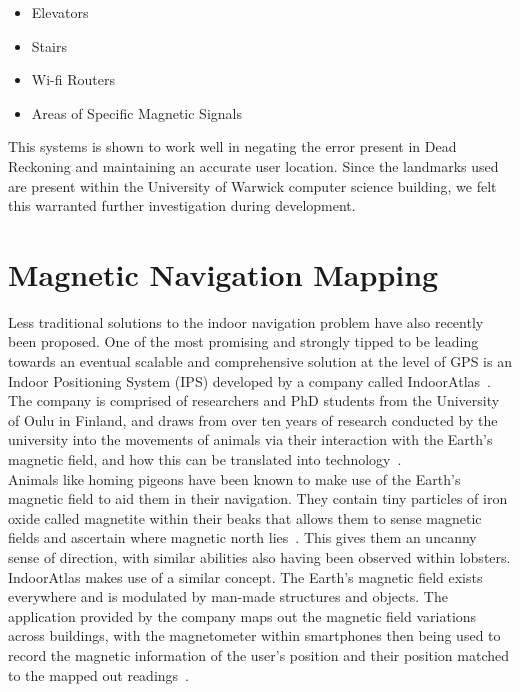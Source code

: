 \documentclass[main.tex]{subfiles}
\begin{document}
\begin{itemize}
	\item Elevators
	\item Stairs
	\item Wi-fi Routers
	\item Areas of Specific Magnetic Signals
\end{itemize}

This systems is shown to work well in negating the error present in Dead Reckoning and maintaining an accurate user location. Since the landmarks used are present within the University of Warwick computer science building, we felt this warranted further investigation during development.

 \section{Magnetic Navigation Mapping}
 
 Less traditional solutions to the indoor navigation problem have also recently been proposed. One of the most promising and strongly tipped to be leading towards an eventual scalable and comprehensive solution at the level of GPS is an Indoor Positioning System (IPS) developed by a company called IndoorAtlas~\cite{indoorAtlas}. The company is comprised of researchers and PhD students from the University of Oulu in Finland, and draws from over ten years of research conducted by the university into the movements of animals via their interaction with the Earth's magnetic field, and how this can be translated into technology~\cite{IAReport}.\\
 
Animals like homing pigeons have been known to make use of the Earth's magnetic field to aid them in their navigation. They contain tiny particles of iron oxide called magnetite within their beaks that allows them to sense magnetic fields and ascertain where magnetic north lies~\cite{pigeon}. This gives them an uncanny sense of direction, with similar abilities also having been observed within lobsters. \\
 
IndoorAtlas makes use of a similar concept. The Earth's magnetic field exists everywhere and is modulated by man-made structures and objects. The application provided by the company maps out the magnetic field variations across buildings, with the magnetometer within smartphones then being used to record the magnetic information of the user's position and their position matched to the mapped out readings~\cite{IAReport}.\\
 
\end{document}
